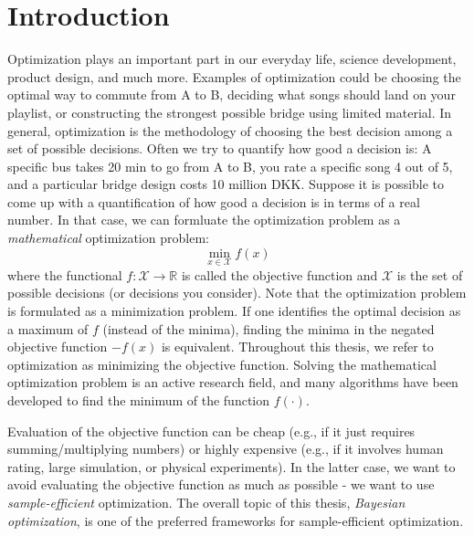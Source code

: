 \chapter{Introduction}

Optimization plays an important part in our everyday life, science development, product design, and
much more. Examples of optimization could be choosing the optimal way to commute from A to B,
deciding what songs should land on your playlist, or constructing the strongest possible bridge
using limited material. In general, optimization is the methodology of choosing the best decision
among a set of possible decisions. Often we try to quantify how good a decision is: A specific bus
takes 20 min to go from A to B, you rate a specific song 4 out of 5, and a particular bridge design
costs 10 million DKK. Suppose it is possible to come up with a quantification of how good a
decision is in terms of a real number. In that case, we can formluate the optimization problem as
a \textit{mathematical} optimization problem: 
$$\min_{x\in \mathcal{X}} f(x)$$ where the functional $f: \mathcal{X} \rightarrow \mathbb{R}$ is
called the objective function and $\mathcal{X}$ is the set of possible decisions (or decisions you
consider). Note that the optimization problem is formulated as a minimization problem. If one
identifies the optimal decision as a maximum of $f$ (instead of the minima), finding the minima in
the negated objective function $-f(x)$ is equivalent. Throughout this thesis, we refer to
optimization as minimizing the objective function. Solving the mathematical optimization problem is
an active research field, and many algorithms have been developed to find the minimum of the function
$f(\cdot)$.

Evaluation of the objective function can be cheap (e.g., if it just requires summing/multiplying
numbers) or highly expensive (e.g., if it involves human rating, large simulation, or physical
experiments). In the latter case, we want to avoid evaluating the objective function as much as
possible - we want to use \textit{sample-efficient} optimization. The overall topic of this
thesis, \textit{Bayesian optimization}, is one of the preferred frameworks for sample-efficient optimization. 

